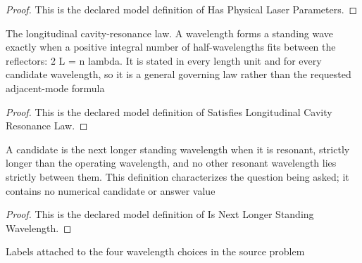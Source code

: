 \begin{proof}
  This is the declared model definition of Has Physical Laser Parameters.
\end{proof}
\begin{definition}
  \label{def:physics:phyx-mini-0245:phyxminiproblems-problemphyxmini0245-satisfieslongitudinalcavityresonancelaw}
  The longitudinal cavity-resonance law. A wavelength forms a standing wave exactly when a positive integral number of half-wavelengths fits between the reflectors: 2 L = n lambda. It is stated in every length unit and for every candidate wavelength, so it is a general governing law rather than the requested adjacent-mode formula
\end{definition}
\begin{proof}
  This is the declared model definition of Satisfies Longitudinal Cavity Resonance Law.
\end{proof}
\begin{definition}
  \label{def:physics:phyx-mini-0245:phyxminiproblems-problemphyxmini0245-isnextlongerstandingwavelength}
  A candidate is the next longer standing wavelength when it is resonant, strictly longer than the operating wavelength, and no other resonant wavelength lies strictly between them. This definition characterizes the question being asked; it contains no numerical candidate or answer value
\end{definition}
\begin{proof}
  This is the declared model definition of Is Next Longer Standing Wavelength.
\end{proof}
\begin{definition}
  \label{def:physics:phyx-mini-0245:phyxminiproblems-problemphyxmini0245-answerchoice}
  Labels attached to the four wavelength choices in the source problem
\end{definition}
